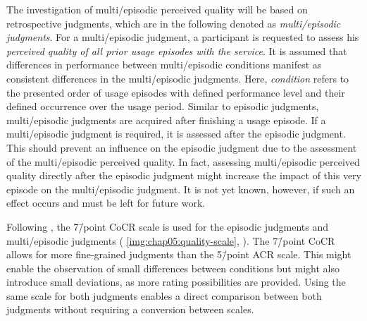 The investigation of multi\-/episodic perceived quality will be based on retrospective judgments, which are in the following denoted as \emph{multi\-/episodic judgments}.
For a multi\-/episodic judgment, a participant is requested to assess his \emph{perceived quality of all prior usage episodes with the service}.
It is assumed that differences in performance between multi\-/episodic conditions manifest as consistent differences in the multi\-/episodic judgments.
Here, \emph{condition} refers to the presented order of usage episodes with defined performance level and their defined occurrence over the usage period.
Similar to episodic judgments, multi\-/episodic judgments are acquired after finishing a usage episode.
If a multi\-/episodic judgment is required, it is assessed after the episodic judgment.
This should prevent an influence on the episodic judgment due to the assessment of the multi\-/episodic perceived quality.
In fact, assessing multi\-/episodic perceived quality directly after the episodic judgment might increase the impact of this very episode on the multi\-/episodic judgment.
It is not yet known, however, if such an effect occurs and must be left for future work.

Following \citet{moller_single-call_2011}, the 7\=/point \acf{CoCR} scale is used for the episodic judgments and multi\-/episodic judgments (\cf{} \autoref{img:chap05:quality-scale}, ).
The 7\=/point \ac{CoCR} allows for more fine-grained judgments than the 5\=/point \ac{ACR} scale.
This might enable the observation of small differences between conditions but might also introduce small deviations, as more rating possibilities are provided.
Using the same scale for both judgments enables a direct comparison between both judgments without requiring a conversion between scales.

